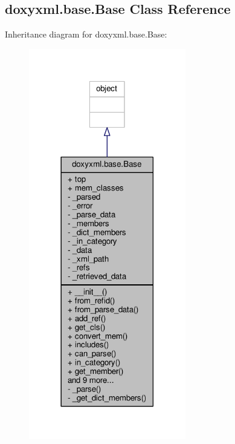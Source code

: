 \subsection{doxyxml.\+base.\+Base Class Reference}
\label{classdoxyxml_1_1base_1_1Base}


Inheritance diagram for doxyxml.\+base.\+Base\+:
\nopagebreak
\begin{figure}[H]
\begin{center}
\leavevmode
\includegraphics[width=194pt]{d8/de4/classdoxyxml_1_1base_1_1Base__inherit__graph}
\end{center}
\end{figure}


